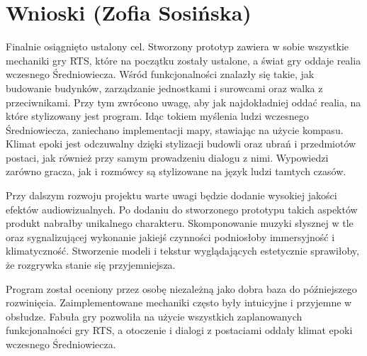\section{Wnioski (Zofia Sosińska)}
Finalnie osiągnięto ustalony cel. Stworzony prototyp zawiera w sobie wszystkie mechaniki gry RTS,
które na początku zostały ustalone, a świat gry oddaje realia wczesnego Średniowiecza. 
Wśród funkcjonalności znalazły się takie, jak budowanie budynków, zarządzanie
jednostkami i surowcami oraz walka z przeciwnikami. Przy tym zwrócono uwagę, aby jak najdokładniej oddać 
realia, na które stylizowany jest program. Idąc tokiem myślenia ludzi wczesnego Średniowiecza, zaniechano
implementacji mapy, stawiając na użycie kompasu. Klimat epoki jest odczuwalny dzięki stylizacji budowli oraz ubrań i przedmiotów postaci,
jak również przy samym prowadzeniu dialogu z nimi. Wypowiedzi zarówno gracza, jak i rozmówcy są stylizowane na język ludzi tamtych czasów.

Przy dalszym rozwoju projektu warte uwagi będzie dodanie wysokiej jakości efektów audiowizualnych. Po dodaniu do stworzonego prototypu takich
aspektów produkt nabrałby unikalnego charakteru. Skomponowanie muzyki słysznej w tle oraz sygnalizującej wykonanie jakiejś czynności podniosłoby immersyjność i klimatyczność.
Stworzenie modeli i tekstur wyglądających estetycznie sprawiłoby, że rozgrywka stanie się przyjemniejsza.

Program został oceniony przez osobę niezależną jako dobra baza do późniejszego rozwinięcia. Zaimplementowane mechaniki często były intuicyjne i przyjemne
w obsłudze. Fabuła gry pozwoliła na użycie wszystkich zaplanowanych funkcjonalności gry RTS, a otoczenie i dialogi z postaciami oddały klimat
epoki wczesnego Średniowiecza.